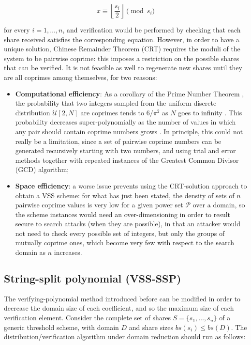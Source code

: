 \documentclass[10pt,journal,cspaper,compsoc]{IEEEtran}
\begin{document}
$$ x \equiv \left\lfloor {\frac{s_i}{2}} \right\rfloor \pmod s_i $$

for every $i=1,\ldots,n$, and verification would be performed by checking that each share received satisfies the corresponding equation.
However, in order to have a unique solution, Chinese Remainder Theorem (CRT) requires the moduli of the system to be pairwise coprime: this imposes a restriction on the possible shares that can be verified.
It is not feasible as well to regenerate new shares until they are all coprimes among themselves, for two reasons:

\begin{itemize}
\item \textbf{Computational efficiency}: As a corollary of the Prime Number Theorem
\cite{books/daglib/0001130}, the probability that two integers sampled from the uniform discrete distribution $\mathcal{U}[2,N]$ are coprimes tends to $6/\pi^2$ as $N$ goes to infinity \cite{books/daglib/0083722}. This probability decreases super-polynomially as the number of values in which any pair should contain coprime numbers grows \cite{toth2002probability}. In principle, this could not really be a limitation, since a set of pairwise coprime numbers can be generated recursively starting with two numbers, and using trial and error methods together with repeated instances of the Greatest Common Divisor (GCD) algorithm;
\item \textbf{Space efficiency}: a worse issue prevents using the CRT-solution approach to obtain a VSS scheme: for what has just been stated, the density of sets of $n$ pairwise coprime values is very low for a given power set $\mathcal{P}$ over a domain, so the scheme instances would need an over-dimensioning in order to result secure to search attacks (when they are possible), in that an attacker would not need to check every possible set of integers, but only the groups of mutually coprime ones, which become very few with respect to the search domain as $n$ increases.
\end{itemize}

\subsection{String-split polynomial (VSS-SSP)}
The verifying-polynomial method introduced before can be modified in order to decrease the domain size of each coefficient, and so the maximum size of each verification element. Consider the complete set of shares $S=\{s_1,\ldots,s_n\}$ of a generic threshold scheme, with domain $D$ and share sizes $bs(s_i)\leq bs(D)$.
The distribution/verification algorithm under domain reduction should run as follows:\\
\end{document}
